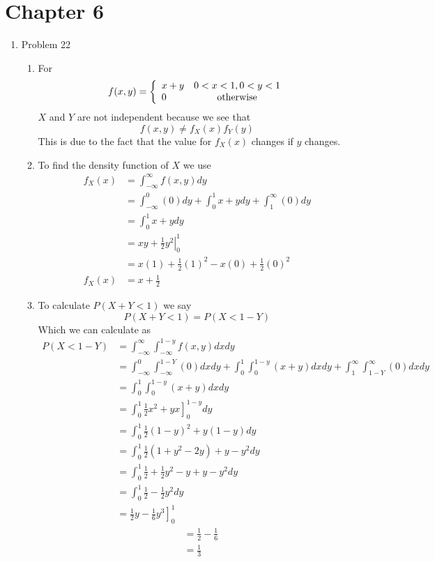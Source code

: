 \documentclass[11pt]{article}
\begin{document}

\section{Chapter 6}
\begin{enumerate}
\item Problem 22
\begin{enumerate}
\item
For
$$f(x,y) = \left\{\begin{array}{lc}
		x+y	&0<x<1,0<y<1\\
		0	&\textnormal{otherwise}
		\end{array}\right.$$
$X$ and $Y$ are not independent because we see that
$$f(x,y)\ne f_X(x)f_Y(y)$$
This is due to the fact that the value for $f_X(x)$ changes if $y$ changes.

\item
To find the density function of $X$ we use
\begin{align*}
f_X(x) &= \int_{-\infty}^{\infty}f(x,y)dy\\
&= \int_{-\infty}^{0}(0)dy + \int_{0}^{1}x+ydy + \int_{1}^{\infty}(0)dy\\
&= \int_{0}^{1}x+ydy\\
&= \left.xy+\frac{1}{2}y^2\right|_{0}^{1}\\
&= x(1)+\frac{1}{2}(1)^2 - x(0)+\frac{1}{2}(0)^2\\
f_X(x) &= x+\frac{1}{2}
\end{align*}

\item
To calculate $P(X+Y<1)$ we say
$$P(X+Y<1) = P(X<1-Y)$$
Which we can calculate as
\begin{align*}
P(X<1-Y) &= \int_{-\infty}^{\infty}\int_{-\infty}^{1-y}f(x,y)dxdy\\
&= \int_{-\infty}^{0}\int_{-\infty}^{1-Y}(0)dxdy+\int_{0}^{1}\int_{0}^{1-y}(x+y)dxdy + \int_{1}^{\infty}\int^{\infty}_{1-Y}(0)dxdy\\
&=  \int_{0}^{1}\int_{0}^{1-y}(x+y)dxdy\\
&=  \int_{0}^{1}\left.\frac{1}{2}x^2+yx\right]_{0}^{1-y}dy\\
&=  \int_{0}^{1}\frac{1}{2}(1-y)^2+y(1-y)dy\\
&=  \int_{0}^{1}\frac{1}{2}(1+y^2-2y)+y-y^2dy\\
&=  \int_{0}^{1}\frac{1}{2}+\frac{1}{2}y^2-y+y-y^2dy\\
&=  \int_{0}^{1}\frac{1}{2}-\frac{1}{2}y^2dy\\
&=  \left.\frac{1}{2}y-\frac{1}{6}y^3\right]_{0}^{1}
\end{align*}
\begin{align*}
&=  \frac{1}{2}-\frac{1}{6}\\
&=  \frac{1}{3}
\end{align*}


\end{enumerate}
\end{enumerate}
\end{document}
